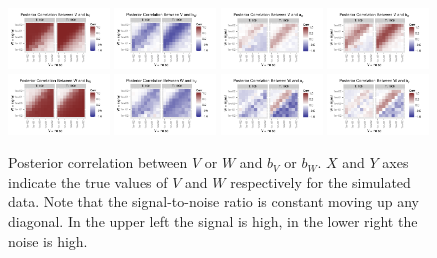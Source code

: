 \documentclass{article}
\begin{document}
\begin{figure}[!ht]
\centering
\includegraphics[width=0.24\textwidth]{plots/corplot1}
\includegraphics[width=0.24\textwidth]{plots/corplot2}
\includegraphics[width=0.24\textwidth]{plots/corplot3}
\includegraphics[width=0.24\textwidth]{plots/corplot4}
\includegraphics[width=0.24\textwidth]{plots/corplot5}
\includegraphics[width=0.24\textwidth]{plots/corplot6}
\includegraphics[width=0.24\textwidth]{plots/corplot7}
\includegraphics[width=0.24\textwidth]{plots/corplot8}
\caption{Posterior correlation between $V$ or $W$ and $b_V$ or $b_W$. $X$ and $Y$ axes indicate the true values of $V$ and $W$ respectively for the simulated data. Note that the signal-to-noise ratio is constant moving up any diagonal. In the upper left the signal is high, in the lower right the noise is high.}
\label{corplot}
\end{figure}
\end{document}
